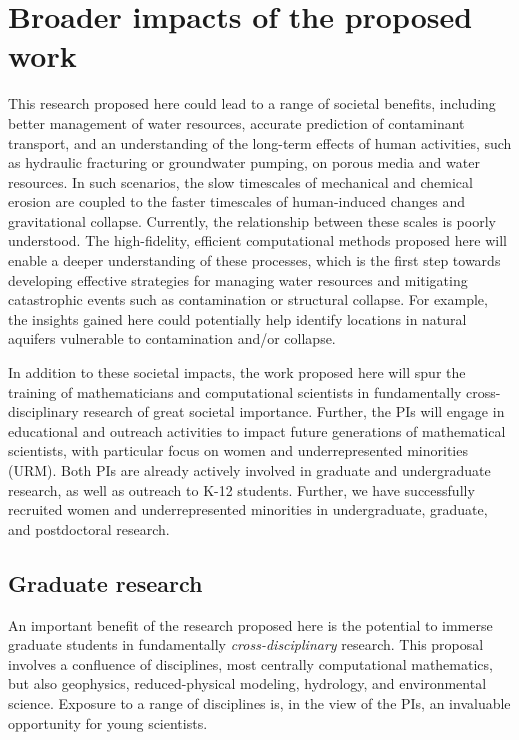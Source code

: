 \documentclass[11pt]{article}
\begin{document}
\section{Broader impacts of the proposed work}

	This research proposed here could lead to a range of societal benefits, including better management of water resources, accurate prediction of contaminant transport, and an understanding of the long-term effects of human activities, such as hydraulic fracturing or groundwater pumping, on porous media and water resources. In such scenarios, the slow timescales of mechanical and chemical erosion are coupled to the faster timescales of human-induced changes and gravitational collapse. Currently, the relationship between these scales is poorly understood. The high-fidelity, efficient computational methods proposed here will enable a deeper understanding of these processes, which is the first step towards developing effective strategies for managing water resources and mitigating catastrophic events such as contamination or structural collapse. For example, the insights gained here could potentially help identify locations in natural aquifers vulnerable to contamination and/or collapse.

	In addition to these societal impacts, the work proposed here will spur the training of mathematicians and computational scientists in fundamentally cross-disciplinary research of great societal importance. Further, the PIs will engage in educational and outreach activities to impact future generations of mathematical scientists, with particular focus on women and underrepresented minorities (URM). 
Both PIs are already actively involved in graduate and undergraduate research, as well as outreach to K-12 students. Further, we have successfully recruited women and underrepresented minorities in undergraduate, graduate, and postdoctoral research.

\subsection{Graduate research}

	An important benefit of the research proposed here is the potential to immerse graduate students in fundamentally {\em cross-disciplinary} research. This proposal involves a confluence of disciplines, most centrally computational mathematics, but also geophysics, reduced-physical modeling, hydrology, and environmental science. Exposure to a range of disciplines is, in the view of the PIs, an invaluable opportunity for young scientists.
\end{document}
